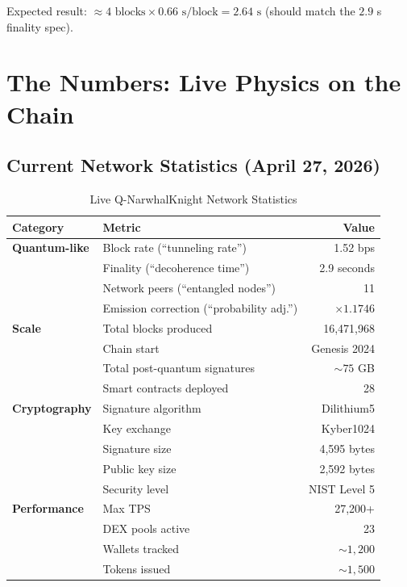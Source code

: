 \documentclass[11pt,a4paper]{article}
\begin{document}
Expected result: $\approx 4 \text{ blocks} \times 0.66 \text{ s/block} = 2.64 \text{ s}$ (should match the $2.9$ s finality spec).

\section{The Numbers: Live Physics on the Chain}

\subsection{Current Network Statistics (April 27, 2026)}

\begin{table}[H]
\centering
\caption{Live Q-NarwhalKnight Network Statistics}
\begin{tabular}{@{}llr@{}}
\toprule
\textbf{Category} & \textbf{Metric} & \textbf{Value} \\
\midrule
\textbf{Quantum-like} & Block rate (``tunneling rate'') & 1.52 bps \\
& Finality (``decoherence time'') & 2.9 seconds \\
& Network peers (``entangled nodes'') & 11 \\
& Emission correction (``probability adj.'') & $\times 1.1746$ \\
\midrule
\textbf{Scale} & Total blocks produced & 16,471,968 \\
& Chain start & Genesis 2024 \\
& Total post-quantum signatures & $\sim 75$ GB \\
& Smart contracts deployed & 28 \\
\midrule
\textbf{Cryptography} & Signature algorithm & Dilithium5 \\
& Key exchange & Kyber1024 \\
& Signature size & 4,595 bytes \\
& Public key size & 2,592 bytes \\
& Security level & NIST Level 5 \\
\midrule
\textbf{Performance} & Max TPS & 27,200+ \\
& DEX pools active & 23 \\
& Wallets tracked & $\sim 1,200$ \\
& Tokens issued & $\sim 1,500$ \\
\bottomrule
\end{tabular}
\end{table}
\end{document}
